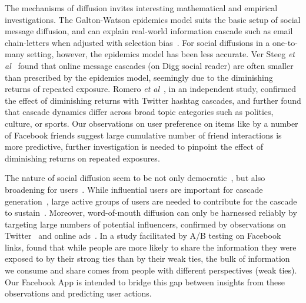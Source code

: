 The mechanisms of diffusion invites interesting mathematical and empirical investigations. 
The Galton-Watson epidemics model suits the basic setup of social
message diffusion, and can explain real-world information cascade such as
email chain-letters when adjusted with selection
bias~\cite{Golub2010selectionbiase}. For social diffusions in a
one-to-many setting, however, the epidemics model has been less
accurate. Ver Steeg {\it et al}~\cite{ver2011stops} found that online message cascades (on
Digg social reader) are often smaller than prescribed by the epidemics
model, seemingly due to the diminishing returns of repeated
exposure. Romero {\it et al}~\cite{Romero2011hashtag}, in an independent study, confirmed
the effect of diminishing returns with Twitter hashtag cascades, and
further found that cascade dynamics differ across broad topic
categories such as politics, culture, or sports. 
Our observations on user preference on items like by a number of Facebook friends 
suggest large cumulative number of friend interactions is more predictive, 
further investigation is needed to pinpoint the effect of diminishing returns on repeated exposures.

The nature of social diffusion seem to be not only democratic~\cite{asur2011trends,Bakshy2011everyone}, but also broadening for users~\cite{Bakshy2012chamber}. While influential users are important for cascade generation~\cite{Bakshy2011everyone}, large active groups of users are needed to contribute for the cascade to sustain~\cite{asur2011trends}. Moreover, word-of-mouth diffusion can only be harnessed reliably by targeting large numbers of potential influencers, confirmed by observations on Twitter~\cite{Bakshy2011everyone} and online ads~\cite{influence}. In a study facilitated by A/B testing on Facebook links, \cite{Bakshy2012chamber} found that while people are more likely to share the information they were exposed to by their strong ties than by their weak ties, the bulk of information we consume and share comes from people with different perspectives (weak ties). Our Facebook App is intended to bridge this gap between insights from these observations and predicting user actions.

